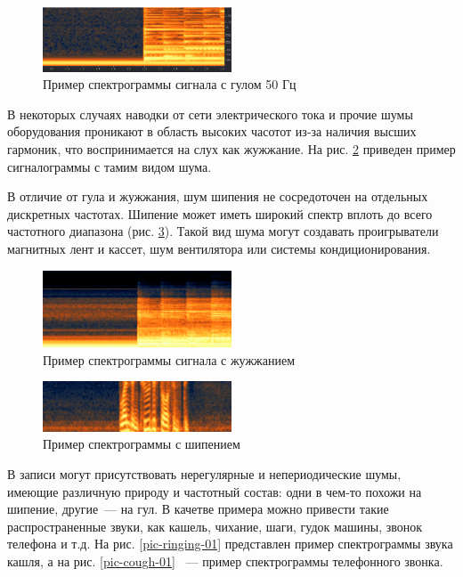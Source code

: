 \documentclass[oneside, final, 14pt]{extreport}
\begin{document}
\begin{figure}[h!]
\centering
\includegraphics[width=0.5\textwidth]{pic-hum-01}
\caption{Пример спектрограммы сигнала с гулом 50 Гц}
\label{pic-hum-01}
\end{figure}

В некоторых случаях наводки от сети электрического тока и прочие шумы оборудования проникают в область высоких часотот из-за наличия высших гармоник, что воспринимается на слух как жужжание. На рис. \ref{pic-hum-02} приведен пример сигналограммы с тамим видом шума.

В отличие от гула и жужжания, шум шипения не сосредоточен на отдельных дискретных частотах. Шипение может иметь широкий спектр вплоть до всего частотного диапазона (рис. \ref{pic-hiss-01}). Такой вид шума могут создавать проигрыватели магнитных лент и кассет, шум вентилятора или системы кондиционирования. 

\begin{figure}[h!]
\centering
\includegraphics[width=0.5\textwidth]{pic-hum-02}
\caption{Пример спектрограммы сигнала с жужжанием}
\label{pic-hum-02}
\end{figure}

\begin{figure}[h!]
\centering
\includegraphics[width=0.5\textwidth]{pic-hiss-01}
\caption{Пример спектрограммы с шипением}
\label{pic-hiss-01}
\end{figure}

В записи могут присутствовать нерегулярные и непериодические шумы, имеющие различную природу и частотный состав: одни в чем-то похожи на шипение, другие~--- на гул. В качетве примера можно привести такие распространенные звуки, как кашель, чихание, шаги, гудок машины, звонок телефона и т.д. На рис. \ref{pic-ringing-01} представлен пример спектрограммы звука кашля, а на рис. \ref{pic-cough-01} ~--- пример спектрограммы телефонного звонка.
\end{document}
